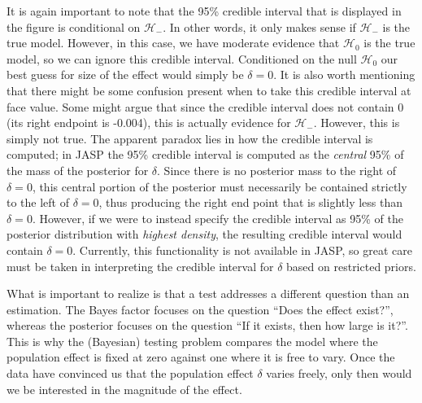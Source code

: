 \documentclass[english,,doc,floatsintext]{apa6}
\begin{document}
It is again important to note that the 95\% credible interval that is displayed in the figure is conditional on \(\mathcal{H}_{-}\). In other words, it only makes sense if \(\mathcal{H}_{-}\) is the true model. However, in this case, we have moderate evidence that \(\mathcal{H}_{0}\) is the true model, so we can ignore this credible interval. Conditioned on the null \(\mathcal{H}_{0}\) our best guess for size of the effect would simply be \(\delta = 0\). It is also worth mentioning that there might be some confusion present when to take this credible interval at face value. Some might argue that since the credible interval does not contain 0 (its right endpoint is -0.004), this is actually evidence for \(\mathcal{H}_{-}\). However, this is simply not true. The apparent paradox lies in how the credible interval is computed; in JASP the 95\% credible interval is computed as the \emph{central} 95\% of the mass of the posterior for \(\delta\). Since there is no posterior mass to the right of \(\delta=0\), this central portion of the posterior must necessarily be contained strictly to the left of \(\delta=0\), thus producing the right end point that is slightly less than \(\delta=0\). However, if we were to instead specify the credible interval as 95\% of the posterior distribution with \emph{highest density}, the resulting credible interval would contain \(\delta=0\). Currently, this functionality is not available in JASP, so great care must be taken in interpreting the credible interval for \(\delta\) based on restricted priors.

What is important to realize is that a test addresses a different question than an estimation. The Bayes factor focuses on the question ``Does the effect exist?'', whereas the posterior focuses on the question ``If it exists, then how large is it?''. This is why the (Bayesian) testing problem compares the model where the population effect is fixed at zero against one where it is free to vary. Once the data have convinced us that the population effect \(\delta\) varies freely, only then would we be interested in the magnitude of the effect.
\end{document}
